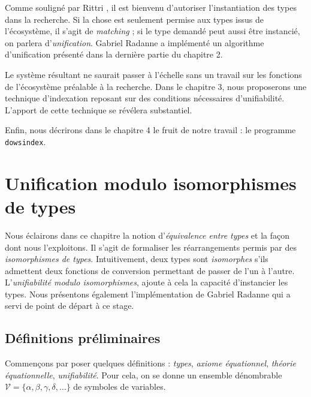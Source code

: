 \documentclass[a4paper]{report}
\theoremstyle{definition}
\newcommand{\dowsindex}{\texttt{dowsindex}\xspace}
\newcommand{\V}{\mathscr{V}}
\begin{document}
Comme souligné par Rittri \cite{Rittri93}, il est bienvenu d'autoriser l'instantiation des types dans la recherche. Si la chose est seulement permise aux types issus de l'écosystème, il s'agit de \emph{matching} ; si le type demandé peut aussi être instancié, on parlera d'\emph{unification}. Gabriel Radanne a implémenté un algorithme d'unification présenté dans la dernière partie du chapitre 2.

Le système résultant ne saurait passer à l'échelle sans un travail sur les fonctions de l'écosystème préalable à la recherche. Dans le chapitre 3, nous proposerons une technique d'indexation reposant sur des conditions nécessaires d'unifiabilité. L'apport de cette technique se révélera substantiel.

Enfin, nous décrirons dans le chapitre 4 le fruit de notre travail : le programme \dowsindex.


\chapter{Unification modulo isomorphismes de types}

Nous éclairons dans ce chapitre la notion d'\emph{équivalence entre types} et la façon dont nous l'exploitons. Il s'agit de formaliser les réarrangements permis par des \emph{isomorphismes de types}. Intuitivement, deux types sont \emph{isomorphes} s'ils admettent deux fonctions de conversion permettant de passer de l'un à l'autre. L'\emph{unifiabilité modulo isomorphismes}, ajoute à cela la capacité d'instancier les types. Nous présentons également l'implémentation de Gabriel Radanne qui a servi de point de départ à ce stage.


\section{Définitions préliminaires}

Commençons par poser quelques définitions : \emph{types}, \emph{axiome équationnel}, \emph{théorie équationnelle}, \emph{unifiabilité}. Pour cela, on se donne un ensemble dénombrable $\V = \{ \alpha, \beta, \gamma, \delta, \dots \}$ de symboles de variables.
\end{document}

